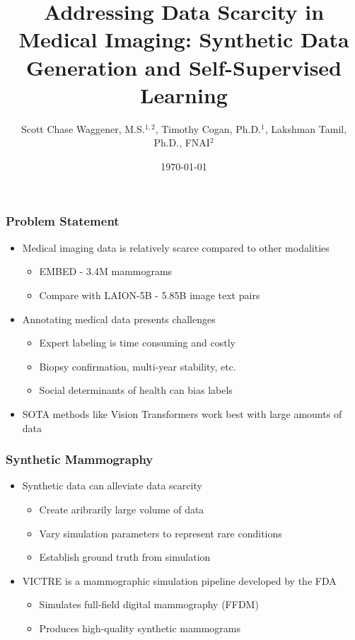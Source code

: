 \documentclass[12pt]{beamer}
\title{Addressing Data Scarcity in Medical Imaging: Synthetic Data Generation and Self-Supervised Learning}
\author{%
  Scott Chase Waggener, M.S.$^{1,2}$, 
  Timothy Cogan, Ph.D.$^1$, 
  Lakshman Tamil, Ph.D., FNAI$^2$
}
\institute{
  $^1$MedCognetics, Inc., Dallas, TX \and
  $^2$University of Texas at Dallas
}
\date{\today}
\begin{document}
\frame{\titlepage}

\begin{frame}
\frametitle{Problem Statement}
\begin{itemize}
    \item Medical imaging data is relatively scarce compared to other modalities
    \begin{itemize}
        \item EMBED\supercite{embed2023} - 3.4M mammograms
        \item Compare with LAION-5B \supercite{laion5b} - 5.85B image text pairs 
    \end{itemize}
    \item Annotating medical data presents challenges
    \begin{itemize}
        \item Expert labeling is time consuming and costly
        \item Biopsy confirmation, multi-year stability, etc.
        \item Social determinants of health can bias labels
    \end{itemize}
    \item SOTA methods like Vision Transformers \supercite{dosovitskiy2020vit} work best with large amounts of data
\end{itemize}
\end{frame}

\begin{frame}
\frametitle{Synthetic Mammography}
\begin{itemize}
    \item Synthetic data can alleviate data scarcity
    \begin{itemize}
        \item Create aribrarily large volume of data
        \item Vary simulation parameters to represent rare conditions
        \item Establish ground truth from simulation
    \end{itemize}
    \item VICTRE \supercite{victre} is a mammographic simulation pipeline developed by the FDA
    \begin{itemize}
        \item Simulates full-field digital mammography (FFDM)
        \item Produces high-quality synthetic mammograms
    \end{itemize}
\end{itemize}
\end{frame}
\end{document}

